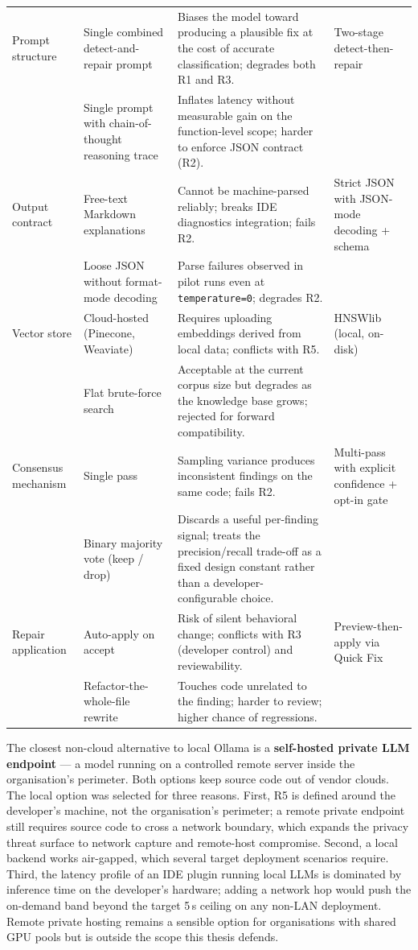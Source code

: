 {\begin{xltabular}{\textwidth}{@{}p{0.16\textwidth}p{0.22\textwidth}Xp{0.13\textwidth}@{}}
  \midrule
  Prompt structure & Single combined detect-and-repair prompt & Biases the model toward producing a plausible fix at the cost of accurate classification; degrades both R1 and R3. & Two-stage detect-then-repair \\
  & Single prompt with chain-of-thought reasoning trace & Inflates latency without measurable gain on the function-level scope; harder to enforce JSON contract (R2). & \\
  \midrule
  Output contract & Free-text Markdown explanations & Cannot be machine-parsed reliably; breaks IDE diagnostics integration; fails R2. & Strict JSON with JSON-mode decoding + schema \\
  & Loose JSON without format-mode decoding & Parse failures observed in pilot runs even at \texttt{temperature=0}; degrades R2. & \\
  \midrule
  Vector store & Cloud-hosted (Pinecone, Weaviate) & Requires uploading embeddings derived from local data; conflicts with R5. & HNSWlib (local, on-disk) \\
  & Flat brute-force search & Acceptable at the current corpus size but degrades as the knowledge base grows; rejected for forward compatibility. & \\
  \midrule
  Consensus mechanism & Single pass & Sampling variance produces inconsistent findings on the same code; fails R2. & Multi-pass with explicit confidence + opt-in gate \\
  & Binary majority vote (keep / drop) & Discards a useful per-finding signal; treats the precision/recall trade-off as a fixed design constant rather than a developer-configurable choice. & \\
  \midrule
  Repair application & Auto-apply on accept & Risk of silent behavioral change; conflicts with R3 (developer control) and reviewability. & Preview-then-apply via Quick Fix \\
  & Refactor-the-whole-file rewrite & Touches code unrelated to the finding; harder to review; higher chance of regressions. & \\
\end{xltabular}}

The closest non-cloud alternative to local Ollama is a \textbf{self-hosted private LLM endpoint} --- a model running on a controlled remote server inside the organisation's perimeter. Both options keep source code out of vendor clouds. The local option was selected for three reasons. First, R5 is defined around the developer's machine, not the organisation's perimeter; a remote private endpoint still requires source code to cross a network boundary, which expands the privacy threat surface to network capture and remote-host compromise. Second, a local backend works air-gapped, which several target deployment scenarios require. Third, the latency profile of an IDE plugin running local LLMs is dominated by inference time on the developer's hardware; adding a network hop would push the on-demand band beyond the target 5\,s ceiling on any non-LAN deployment. Remote private hosting remains a sensible option for organisations with shared GPU pools but is outside the scope this thesis defends.

